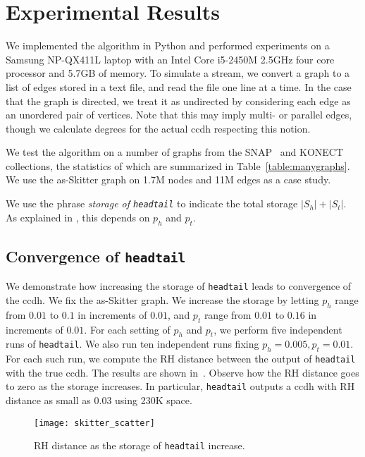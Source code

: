 \documentclass[11pt]{article}
\theoremstyle{definition}
\newcommand{\degdist}{{\tt headtail}}
\begin{document}
\section{Experimental Results} \label{sec:expresults}
We implemented the algorithm in Python and performed experiments on a Samsung
NP-QX411L laptop with an Intel Core i5-2450M 2.5GHz four core processor and
5.7GB of memory.  To simulate a stream, we convert a graph to a list of edges
stored in a text file, and read the file one line at a time.  In the case that
the graph is directed, we treat it as undirected by considering each edge as an
unordered pair of vertices.  Note that this may imply multi- or parallel edges,
though we calculate degrees for the actual ccdh respecting this notion.

We test the algorithm on a number of graphs from the SNAP~\cite{snap} and
KONECT~\cite{konect} collections, the statistics of which are summarized in
Table~\ref{table:manygraphs}.  We use the as-Skitter graph on 1.7M nodes and 11M
edges as a case study.

We use the phrase \emph{storage of \degdist} to indicate the total storage $|S_h| + |S_t|$.
As explained in , this depends on $p_h$ and $p_t$.

\subsection{Convergence of \degdist} \label{sec:conv}
We demonstrate how increasing the storage of \degdist{} leads to convergence of
the ccdh. We fix the as-Skitter graph. We increase the storage by letting $p_h$
range from $0.01$ to $0.1$ in increments of $0.01$, and $p_t$ range from $0.01$
to $0.16$ in increments of $0.01$.  For each setting of $p_h$ and $p_t$, we
perform five independent runs of \degdist. We also run ten independent runs
fixing $p_h=0.005, p_t=0.01$.  For each such run, we compute the RH distance
between the output of \degdist{} with the true ccdh. The results are shown
in~. Observe how the RH distance goes to zero as the
storage increases.  In particular, \degdist{} outputs a ccdh with RH distance as
small as $0.03$ using 230K space.
\begin{figure}
\centering \texttt{[image: skitter\_scatter]}
\caption{RH distance as the storage of \degdist{} increase.}
\label{fig:skitter_scatter}
\end{figure}
\end{document}
